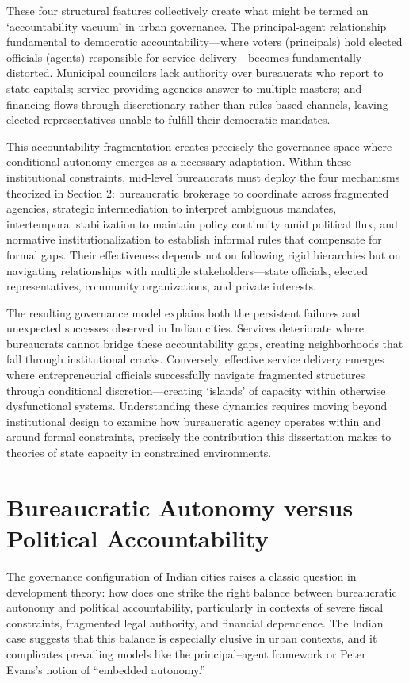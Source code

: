These four structural features collectively create what might be termed an `accountability vacuum' in urban governance. The principal-agent relationship fundamental to democratic accountability—where voters (principals) hold elected officials (agents) responsible for service delivery—becomes fundamentally distorted. Municipal councilors lack authority over bureaucrats who report to state capitals; service-providing agencies answer to multiple masters; and financing flows through discretionary rather than rules-based channels, leaving elected representatives unable to fulfill their democratic mandates.

This accountability fragmentation creates precisely the governance space where conditional autonomy emerges as a necessary adaptation. Within these institutional constraints, mid-level bureaucrats must deploy the four mechanisms theorized in Section 2: bureaucratic brokerage to coordinate across fragmented agencies, strategic intermediation to interpret ambiguous mandates, intertemporal stabilization to maintain policy continuity amid political flux, and normative institutionalization to establish informal rules that compensate for formal gaps. Their effectiveness depends not on following rigid hierarchies but on navigating relationships with multiple stakeholders—state officials, elected representatives, community organizations, and private interests.

The resulting governance model explains both the persistent failures and unexpected successes observed in Indian cities. Services deteriorate where bureaucrats cannot bridge these accountability gaps, creating neighborhoods that fall through institutional cracks. Conversely, effective service delivery emerges where entrepreneurial officials successfully navigate fragmented structures through conditional discretion—creating `islands' of capacity within otherwise dysfunctional systems. Understanding these dynamics requires moving beyond institutional design to examine how bureaucratic agency operates within and around formal constraints, precisely the contribution this dissertation makes to theories of state capacity in constrained environments.

\section{Bureaucratic Autonomy versus Political Accountability}

The governance configuration of Indian cities raises a classic question in development theory: how does one strike the right balance between bureaucratic autonomy and political accountability, particularly in contexts of severe fiscal constraints, fragmented legal authority, and financial dependence. The Indian case suggests that this balance is especially elusive in urban contexts, and it complicates prevailing models like the principal--agent framework or Peter Evans's notion of ``embedded autonomy.''

